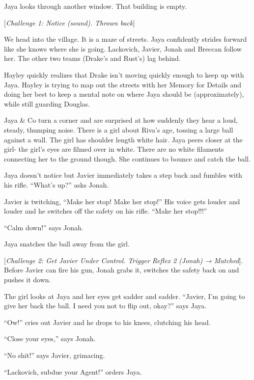 Jaya looks through another window.  That building is empty.

{[}\textit{Challenge 1: Notice (sound).  Thrown back}{]}



We head into the village.  It is a maze of streets.  Jaya confidently strides forward like she knows where she is going.  Lackovich, Javier, Jonah and Breccan follow her.  The other two teams (Drake's and Rust's) lag behind.



Hayley quickly realizes that Drake isn't moving quickly enough to keep up with Jaya.  Hayley is trying to map out the streets with her Memory for Details and doing her best to keep a mental note on where Jaya should be (approximately), while still guarding Douglas.



Jaya \& Co turn a corner and are surprised at how suddenly they hear a loud, steady, thumping noise.  There is a girl about Riva's age, tossing a large ball against a wall.  The girl has shoulder length white hair.  Jaya peers closer at the girl- the girl's eyes are filmed over in white.  There are no white filaments connecting her to the ground though.  She continues to bounce and catch the ball.



Jaya doesn't notice but Javier immediately takes a step back and fumbles with his rifle.  ``What's up?'' asks Jonah.  

Javier is twitching, ``Make her stop!  Make her stop!'' His voice gets louder and louder and he switches off the safety on his rifle.  ``Make her stop!!!''

``Calm down!'' says Jonah.

Jaya snatches the ball away from the girl.

{[}\textit{Challenge 2: Get Javier Under Control.  Trigger Reflex 2 (Jonah) → Matched}{]}. Before Javier can fire his gun, Jonah grabs it, switches the safety back on and pushes it down. 

The girl looks at Jaya and her eyes get sadder and sadder.  ``Javier, I'm going to give her back the ball.  I need you not to flip out, okay?'' says Jaya.

``Ow!'' cries out Javier and he drops to his knees, clutching his head.

``Close your eyes,'' says Jonah.

``No shit!'' says Javier, grimacing.

``Lackovich, subdue your Agent!'' orders Jaya.


